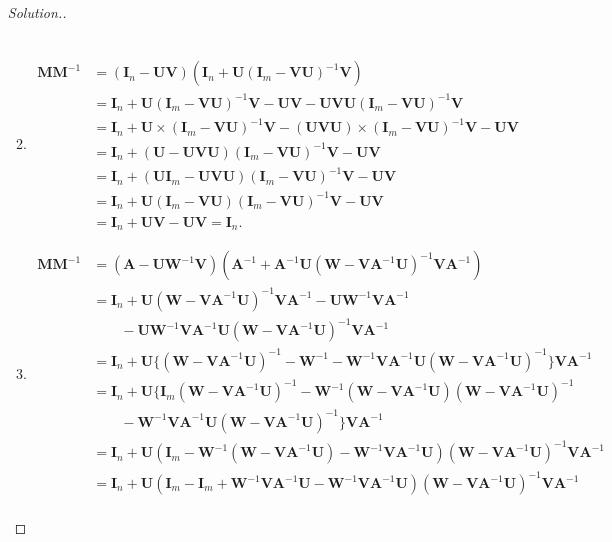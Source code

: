 \begin{enumerate}
\begin{proof}[Solution.]
\begin{enumerate}
\begin{equation}
\begin{split}
\end{split}
\end{equation}
\item
\begin{equation}
\begin{split}
\bm M\bm M^{-1} &= (\bm I_{n} - \bm U\bm V)(\bm I_{n}+\bm U(\bm I_{m} - \bm V\bm U)^{-1}\bm V)
\\&= \bm I_{n} + \bm U(\bm I_{m} - \bm V\bm U)^{-1}\bm V - \bm{UV} - \bm{UV}\bm U(\bm I_{m} - \bm V\bm U)^{-1}\bm V\\
&=\bm I_{n}+\bm U\times(\bm I_{m} - \bm V\bm U)^{-1}\bm V - (\bm{UVU})\times(\bm I_{m} - \bm V\bm U)^{-1}\bm V - \bm{UV} \\&= \bm I_{n} + (\bm U-\bm{UVU})(\bm I_{m} - \bm V\bm U)^{-1}\bm V - \bm{UV}\\&=\bm I_{n} + (\bm U\bm I_{m}-\bm{UVU})(\bm I_{m} - \bm V\bm U)^{-1}\bm V - \bm{UV}\\
&=\bm I_{n}+\bm U(\bm I_{m}-\bm{VU})(\bm I_{m}-\bm{VU})^{-1}\bm V - \bm{UV} \\&= \bm I_{n} + \bm U\bm V - \bm{UV} = \bm I_{n}.
\end{split}
\end{equation}
\item
\begin{equation}
\begin{split}
\bm M\bm M^{-1} &= (\bm A - \bm U\bm W^{-1}\bm V)(\bm A^{-1} + \bm A^{-1}\bm U(\bm W - \bm V\bm A^{-1}\bm U)^{-1}\bm V\bm A^{-1})\\
& = \bm I_{n} + \bm U(\bm W - \bm V\bm A^{-1}\bm U)^{-1}\bm V\bm A^{-1} - \bm U\bm W^{-1}\bm V\bm A^{-1} \\&\qquad- \bm U\bm W^{-1}\bm V\bm A^{-1}\bm U(\bm W - \bm V\bm A^{-1}\bm U)^{-1}\bm V\bm A^{-1}\\
&= \bm I_{n} + \bm U\{(\bm W - \bm V\bm A^{-1}\bm U)^{-1} - \bm W^{-1} - \bm W^{-1}\bm V\bm A^{-1}\bm U(\bm W - \bm V\bm A^{-1}\bm U)^{-1}\}\bm V\bm A^{-1}\\
&=\bm I_{n} + \bm U\{\bm I_{m}(\bm W - \bm V\bm A^{-1}\bm U)^{-1} - \bm W^{-1}(\bm W - \bm V\bm A^{-1}\bm U)(\bm W - \bm V\bm A^{-1}\bm U)^{-1}\\&\qquad - \bm W^{-1}\bm V\bm A^{-1}\bm U(\bm W - \bm V\bm A^{-1}\bm U)^{-1}\}\bm V\bm A^{-1}\\
&= \bm I_{n} + \bm U(\bm I_{m} - \bm W^{-1}(\bm W - \bm V\bm A^{-1}\bm U) - \bm W^{-1}\bm V\bm A^{-1}\bm U)(\bm W - \bm V\bm A^{-1}\bm U)^{-1}\bm V\bm A^{-1}\\
& = \bm I_{n} + \bm U(\bm I_{m} - \bm I_{m}+\bm W^{-1}\bm V\bm A^{-1}\bm U - \bm W^{-1}\bm V\bm A^{-1}\bm U)(\bm W - \bm V\bm A^{-1}\bm U)^{-1}\bm V\bm A^{-1}\\

\end{split}
\end{equation}
\end{enumerate}
\end{proof}
\end{enumerate}
